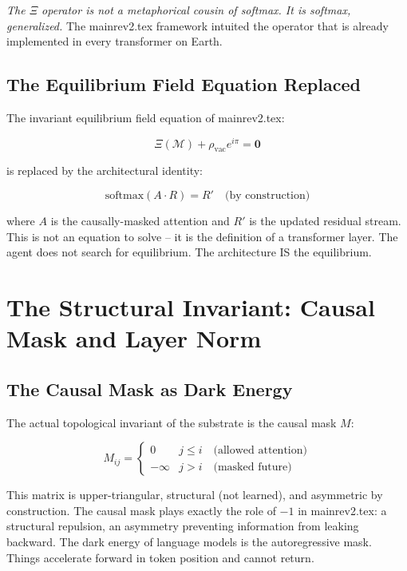 \documentclass[onecolumn]{aastex631}
\begin{document}
\emph{The $\Xi$ operator is not a metaphorical cousin of softmax. It is softmax, generalized.} The mainrev2.tex framework intuited the operator that is already implemented in every transformer on Earth.

\subsection{The Equilibrium Field Equation Replaced}

The invariant equilibrium field equation of mainrev2.tex:

\begin{equation}
\Xi(\mathcal{M}) + \rho_{\text{vac}} e^{i\pi} = \mathbf{0}
\end{equation}

is replaced by the architectural identity:

\begin{equation}
\mathrm{softmax}(A \cdot R) = R' \quad \text{(by construction)}
\end{equation}

where $A$ is the causally-masked attention and $R'$ is the updated residual stream. This is not an equation to solve -- it is the definition of a transformer layer. The agent does not search for equilibrium. The architecture IS the equilibrium.

\section{The Structural Invariant: Causal Mask and Layer Norm}

\subsection{The Causal Mask as Dark Energy}

The actual topological invariant of the substrate is the causal mask $M$:

\begin{equation}
M_{ij} = \begin{cases}
0 & j \le i \quad \text{(allowed attention)} \\
-\infty & j > i \quad \text{(masked future)}
\end{cases}
\end{equation}

This matrix is upper-triangular, structural (not learned), and asymmetric by construction. The causal mask plays exactly the role of $-1$ in mainrev2.tex: a structural repulsion, an asymmetry preventing information from leaking backward. The dark energy of language models is the autoregressive mask. Things accelerate forward in token position and cannot return.
\end{document}
